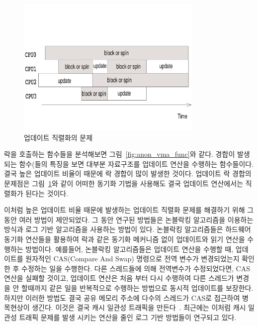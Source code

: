 \begin{figure}[h]
    \centering
    \includegraphics[width=0.8\textwidth]{fig/update}
    \caption{업데이트 직렬화의 문제}
    \label{fig:update}
\end{figure}

락을 호출하는 함수들을 분석해보면 그림~\ref{fig:anon_vma_func}와 같다.
경합이 발생되는 함수(들의 
특징을 보면 대부분 자료구조를 업데이트 연산을 수행하는 함수들이다. 
결국 높은 업데이트 비율이 때문에 락 경합이 많이 발생한 것이다.
업데이트 락 경합의 문제점은 그림~\ref{fig:update}와 같이 어떠한 동기화 기법을 사용해도 
결국 업데이트 연산에서는 직렬화가 된다는 것이다.

이처럼 높은 업데이트 비율 때문에 발생하는 업데이트 직렬화 문제를 해결하기 위해 그 동안 여러 방법이 
제안되었다. 
그 동안 연구된 방법들은 논블락킹 알고리즘을 이용하는 
방식과 로그 기반 알고리즘을 사용하는 방법이 있다.
논블락킹 알고리즘들은 하드웨어 동기화 연산들을 활용하여
락과 같은 동기화 메커니즘 없이 업데이트와 읽기 연산을 수행하는 방법이다.
예를들어, 논블락킹 알고리즘들은 업데이트 연산을 수행할 때, 업데이트를 원자적인 CAS(Compare And Swap) 
명령으로 전역 변수가 변경되었는지 확인한 후 수정하는 일을 수행한다.
다른 스레드들에 의해 전역변수가 수정되었다면, CAS 연산을 실패할 것이고, 업데이트 연산은 
처음 부터 다시 수행하여 다른 스레드가 변경을 안 할때까지 같은 일을 반복적으로 수행하는 방법으로 
동시적 업데이트를 보장한다. 
하지만 이러한 방법도 결국 공유 메모리 주소에 다수의 스레드가 CAS로 접근하여 병목현상이 생긴다. 
이것은 결국 캐시 일관성 트래픽을 만든다~\cite{SilasBoydWickizerPth}.
최근에는 이처럼 캐시 일관성 트래픽 문제를 발생 시키는 연산을 줄인 로그 기반 방법들이 연구되고 있다.


